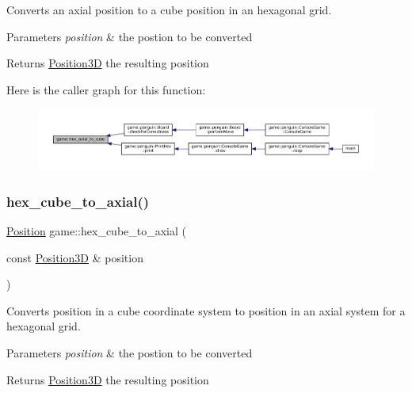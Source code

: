 Converts an axial position to a cube position in an hexagonal grid. 


\begin{DoxyParams}{Parameters}
{\em position} & the postion to be converted \\
\hline
\end{DoxyParams}
\begin{DoxyReturn}{Returns}
\hyperlink{structgame_1_1_position3_d}{Position3D} the resulting position 
\end{DoxyReturn}
Here is the caller graph for this function\+:
\nopagebreak
\begin{figure}[H]
\begin{center}
\leavevmode
\includegraphics[width=350pt]{namespacegame_a758b3d0eea6eae0e6ce5ea1b8dc90ed9_icgraph}
\end{center}
\end{figure}
\mbox{\label{namespacegame_a850c02ba5e94fc33424e8d7a34c93e9f}} 
\subsubsection{\texorpdfstring{hex\+\_\+cube\+\_\+to\+\_\+axial()}{hex\_cube\_to\_axial()}}
{\footnotesize\ttfamily \hyperlink{structgame_1_1_position}{Position} game\+::hex\+\_\+cube\+\_\+to\+\_\+axial (\begin{DoxyParamCaption}\item[{const \hyperlink{structgame_1_1_position3_d}{Position3D} \&}]{position }\end{DoxyParamCaption})}



Converts position in a cube coordinate system to position in an axial system for a hexagonal grid. 


\begin{DoxyParams}{Parameters}
{\em position} & the postion to be converted \\
\hline
\end{DoxyParams}
\begin{DoxyReturn}{Returns}
\hyperlink{structgame_1_1_position3_d}{Position3D} the resulting position 
\end{DoxyReturn}
\mbox{\label{namespacegame_a0fb03836882da582210ce59b390ad61f}} 
